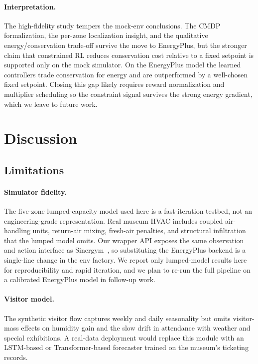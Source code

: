 \documentclass[11pt,a4paper]{article}
\begin{document}
\paragraph{Interpretation.}
The high-fidelity study tempers the mock-env conclusions. The CMDP
formalization, the per-zone localization insight, and the qualitative
energy/conservation trade-off survive the move to EnergyPlus, but the
stronger claim that constrained RL reduces conservation cost relative
to a fixed setpoint is supported only on the mock simulator. On the
EnergyPlus model the learned controllers trade conservation for energy
and are outperformed by a well-chosen fixed setpoint. Closing this gap
likely requires reward normalization and multiplier scheduling so the
constraint signal survives the strong energy gradient, which we leave
to future work.

\section{Discussion}\label{sec:discussion}

\subsection{Limitations}

\paragraph{Simulator fidelity.}
The five-zone lumped-capacity model used here is a fast-iteration
testbed, not an engineering-grade representation. Real museum HVAC
includes coupled air-handling units, return-air mixing, fresh-air
penalties, and structural infiltration that the lumped model omits.
Our wrapper API exposes the same observation and action interface as
Sinergym~\citep{manjavacas2024sinergym}, so substituting the
EnergyPlus backend is a single-line change in the env factory. We
report only lumped-model results here for reproducibility and rapid
iteration, and we plan to re-run the full pipeline on a calibrated
EnergyPlus model in follow-up work.

\paragraph{Visitor model.}
The synthetic visitor flow captures weekly and daily seasonality but
omits visitor-mass effects on humidity gain and the slow drift in
attendance with weather and special exhibitions. A real-data
deployment would replace this module with an LSTM-based or
Transformer-based forecaster trained on the museum's ticketing
records.
\end{document}
